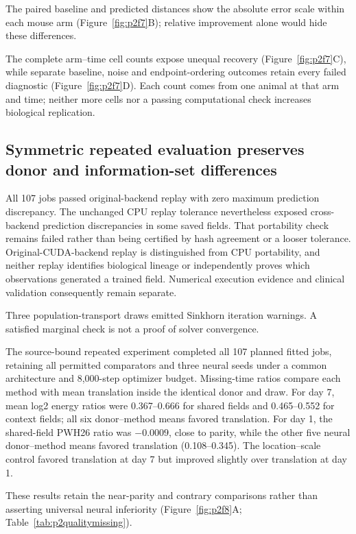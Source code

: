 \documentclass[10pt,a4paper]{article}
\begin{document}
The paired baseline and predicted distances show the absolute error scale within each mouse arm (Figure~\ref{fig:p2f7}B); relative improvement alone would hide these differences.

The complete arm--time cell counts expose unequal recovery (Figure~\ref{fig:p2f7}C), while separate baseline, noise and endpoint-ordering outcomes retain every failed diagnostic (Figure~\ref{fig:p2f7}D). Each count comes from one animal at that arm and time; neither more cells nor a passing computational check increases biological replication.




\subsection{Symmetric repeated evaluation preserves donor and information-set differences}

All 107 jobs passed original-backend replay with zero maximum prediction discrepancy. The unchanged CPU replay tolerance nevertheless exposed cross-backend prediction discrepancies in some saved fields. That portability check remains failed rather than being certified by hash agreement or a looser tolerance. Original-CUDA-backend replay is distinguished from CPU portability, and neither replay identifies biological lineage or independently proves which observations generated a trained field. Numerical execution evidence and clinical validation consequently remain separate.

Three population-transport draws emitted Sinkhorn iteration warnings. A satisfied marginal check is not a proof of solver convergence.

The source-bound repeated experiment completed all 107 planned fitted jobs, retaining all permitted comparators and three neural seeds under a common architecture and 8,000-step optimizer budget. Missing-time ratios compare each method with mean translation inside the identical donor and draw. For day 7, mean log2 energy ratios were 0.367--0.666 for shared fields and 0.465--0.552 for context fields; all six donor--method means favored translation. For day 1, the shared-field PWH26 ratio was $-0.0009$, close to parity, while the other five neural donor--method means favored translation (0.108--0.345). The location--scale control favored translation at day 7 but improved slightly over translation at day 1.

These results retain the near-parity and contrary comparisons rather than asserting universal neural inferiority (Figure~\ref{fig:p2f8}A\label{call:p2f8}; Table~\ref{tab:p2qualitymissing}).
\end{document}
